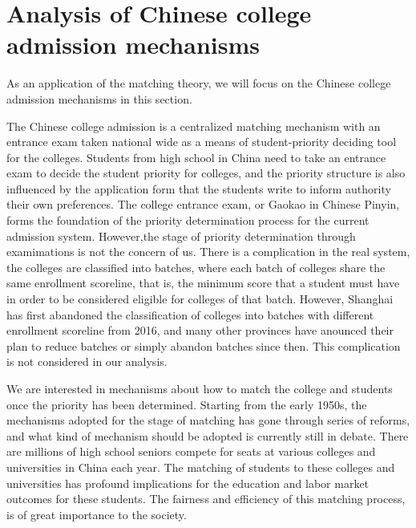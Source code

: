 



\section{Analysis of Chinese college admission mechanisms}

As an application of the matching theory, we will focus
on the Chinese college admission mechanisms in this section.

The Chinese college admission is a centralized matching mechanism with
an entrance exam taken national wide as a means of student-priority
deciding tool for the colleges.
Students from high school in China need to take an entrance exam to
decide the student priority for colleges, and the priority structure
is also influenced by the application form that the students write to
inform authority their own preferences. The college entrance exam, or Gaokao in Chinese Pinyin,  forms the 
foundation of the priority determination process for the current
admission system. However,the stage of priority determination through examimations is not the concern of us. There is a complication in the real system, the colleges are classified into batches, where each batch of colleges share the same enrollment scoreline, that is, the minimum score that a student must have in order to be considered eligible for colleges of that batch. However, Shanghai has first abandoned the classification of colleges into batches with different enrollment scoreline from 2016, and many other provinces have anounced their plan to reduce batches or simply abandon batches since then. This complication is not considered in our analysis.

We are interested in mechanisms about how to match the college and students once the priority has been determined. Starting from the early 1950s,
the mechanisms adopted for the stage of matching has gone
through series of reforms,  and what kind of mechanism should be adopted is
currently still in debate. There are millions of high school seniors compete
for  seats at various colleges and universities in China each
year. The matching of students to these colleges and universities has
profound implications for the education and labor market outcomes for
these students.  The fairness and efficiency of this matching process,
is of great importance to the society.

